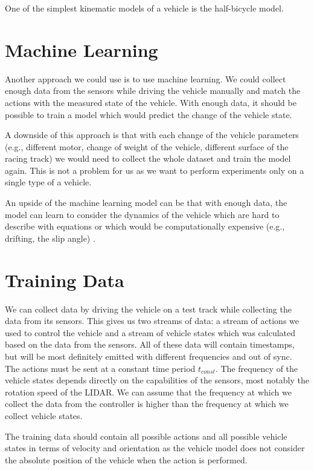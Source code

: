 One of the simplest kinematic models of a vehicle is the half-bicycle model.

\section{Machine Learning}

Another approach we could use is to use machine learning. We could collect enough data from the sensors while driving the vehicle manually and match the actions with the measured state of the vehicle. With enough data, it should be possible to train a model which would predict the change of the vehicle state.

A downside of this approach is that with each change of the vehicle parameters (e.g., different motor, change of weight of the vehicle, different surface of the racing track) we would need to collect the whole dataset and train the model again. This is not a problem for us as we want to perform experiments only on a single type of a vehicle.

An upside of the machine learning model can be that with enough data, the model can learn to consider the dynamics of the vehicle which are hard to describe with equations or which would be computationally expensive (e.g., drifting, the slip angle) \cite{}.

\section{Training Data}

We can collect data by driving the vehicle on a test track while collecting the data from its sensors. This gives us two streams of data: a stream of actions we used to control the vehicle and a stream of vehicle states which was calculated based on the data from the sensors. All of these data will contain timestamps, but will be most definitely emitted with different frequencies and out of sync. The actions must be sent at a constant time period $t_{const}$. The frequency of the vehicle states depends directly on the capabilities of the sensors, most notably the rotation speed of the LIDAR. We can assume that the frequency at which we collect the data from the controller is higher than the frequency at which we collect vehicle states.

The training data should contain all possible actions and all possible vehicle states in terms of velocity and orientation as the vehicle model does not consider the absolute position of the vehicle when the action is performed.


